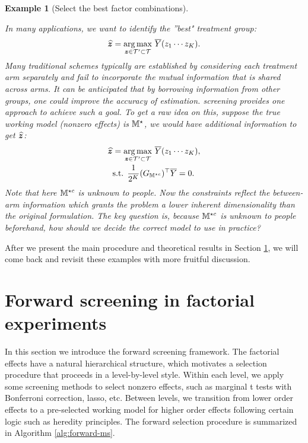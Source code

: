 \documentclass[12pt]{article}
\newtheorem{example}{Example}
\begin{document}
\begin{example}[Select the best factor combinations]\label{exp:select-best}

In many applications, we want to identify the ''best" treatment group:
\begin{align}\label{eqn:hat-bz}
    \widehat{{\boldsymbol{z}}} = \underset{{\boldsymbol{z}}\in{\mathcal{T}}'\subset{\mathcal{T}}}{\arg\max}~ \overline{Y}(z_1\cdots z_K).
\end{align}
Many traditional schemes typically are established by considering each treatment arm separately and fail to incorporate the mutual information that is shared across arms. It can be anticipated that by borrowing information from other groups, one could improve the accuracy of estimation.  screening provides one approach to achieve such a goal. To get a raw idea on this, suppose the true working model (nonzero effects) is ${\mathbb{M}}^\star$, we would have additional information to get $\widehat{{\boldsymbol{z}}}$:
\begin{align}\label{eqn:hat-bz-general}
    \widehat{{\boldsymbol{z}}} &= \underset{{\boldsymbol{z}}\in{\mathcal{T}}'\subset{\mathcal{T}}}{\arg\max}~ \overline{Y}(z_1\cdots z_K), \\
    &\text{s.t. }  \frac{1}{2^K}(G_{{\mathbb{M}}^{\star c}})^\top \overline{Y} = 0. \notag
\end{align}
Note that here ${\mathbb{M}}^{\star c} $ is unknown to people.
Now the constraints reflect the between-arm information which grants the problem a lower inherent dimensionality than the original formulation. The key question is, because ${\mathbb{M}}^{\star c}$ is unknown to people beforehand, how should we decide the correct model to use in practice?
\end{example}



After we present the main procedure and theoretical results in Section \ref{sec:forward-framework}, we will come back and revisit these examples with more fruitful discussion.

\section{Forward screening in factorial experiments} \label{sec:forward-framework}

In this section we introduce the forward screening framework. The factorial effects have a natural hierarchical structure, which motivates a selection procedure that proceeds in a level-by-level style. Within each level, we apply some  screening methods to select nonzero effects, such as marginal t tests with Bonferroni correction, lasso, etc. Between levels, we transition from lower order effects to a pre-selected working model for higher order effects following certain logic such as heredity principles. The forward selection procedure is summarized in Algorithm \ref{alg:forward-ms}.
\end{document}
